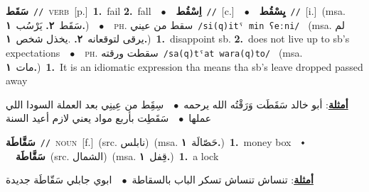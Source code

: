 \documentclass[10pt,a4paper,twoside]{article} %
\begin{document}
\begin{multicols}{2}
{\setlength\topsep{0pt}\textbf{\foreignlanguage{arabic}{سَقَط}}\ {\color{gray}\texttt{//}\color{black}}\ \textsc{verb}\ [p.]\ \textbf{1.}~fail  \textbf{2.}~fall\ \ $\bullet$\ \ \setlength\topsep{0pt}\textbf{\foreignlanguage{arabic}{اِسْقُط}}\ {\color{gray}\texttt{//}\color{black}}\ [c.]\ \ $\bullet$\ \ \setlength\topsep{0pt}\textbf{\foreignlanguage{arabic}{يِسْقُط}}\ {\color{gray}\texttt{//}\color{black}}\ [i.]\ \color{gray}(msa. \foreignlanguage{arabic}{سَقَط}~\foreignlanguage{arabic}{\textbf{٢.}}  \foreignlanguage{arabic}{يَرْسُب}~\foreignlanguage{arabic}{\textbf{١.}})\color{black}\ \ $\bullet$\ \ \textsc{ph.} \color{gray} \foreignlanguage{arabic}{سقط من عيني}\color{black}\ {\color{gray}\texttt{/{\sffamily si(q)itˤ min ʕeːni}/}\color{black}}\ \color{gray} (msa. \foreignlanguage{arabic}{لم يرقى لتوقعانه}~\foreignlanguage{arabic}{\textbf{٢.}}  .\foreignlanguage{arabic}{يخذل شخص}~\foreignlanguage{arabic}{\textbf{١.}})\color{black}\ \textbf{1.}~disappoint sb.  \textbf{2.}~does not live up to sb's expectations\ \ $\bullet$\ \ \textsc{ph.} \color{gray} \foreignlanguage{arabic}{سقطت ورقته}\color{black}\ {\color{gray}\texttt{/{\sffamily sa(q)tˤat wara(q)to}/}\color{black}}\ \color{gray} (msa. \foreignlanguage{arabic}{مات}~\foreignlanguage{arabic}{\textbf{١.}})\color{black}\ \textbf{1.}~It is an idiomatic expression tha means tha sb's leave dropped passed away\  \begin{flushright}\color{gray}\foreignlanguage{arabic}{\textbf{\underline{\foreignlanguage{arabic}{أمثلة}}}: أبو خالد سَقَطَت وَرَقْتُه الله يرحمه\ $\bullet$\ \  سِقَِط من عِينِي بعد العملة السودا اللي عملها\ $\bullet$\ \  سَقَطِت بأربع مواد يعني لازم أعيد السنة}\end{flushright}\color{black}} \vspace{2mm}

{\setlength\topsep{0pt}\textbf{\foreignlanguage{arabic}{سَقَّاطَة}}\ {\color{gray}\texttt{//}\color{black}}\ \textsc{noun}\ [f.]\ (src. \color{gray}\foreignlanguage{arabic}{نابلس}\color{black})\ \color{gray}(msa. \foreignlanguage{arabic}{حَصّالَة}~\foreignlanguage{arabic}{\textbf{١.}})\color{black}\ \textbf{1.}~money box\ \ $\smblkdiamond$\ \ \setlength\topsep{0pt}\textbf{\foreignlanguage{arabic}{سَقَّاطَة}}\ (src. \color{gray}\foreignlanguage{arabic}{الشمال}\color{black})\ \color{gray}(msa. \foreignlanguage{arabic}{قِفل}~\foreignlanguage{arabic}{\textbf{١.}})\color{black}\ \textbf{1.}~a lock\  \begin{flushright}\color{gray}\foreignlanguage{arabic}{\textbf{\underline{\foreignlanguage{arabic}{أمثلة}}}: تنساش تنساش تسكر الباب بالسقاطة\ $\bullet$\ \  ابوي جابلي سَقّاطَة جديدة}\end{flushright}\color{black}} \vspace{2mm}


\end{multicols}
\end{document}
